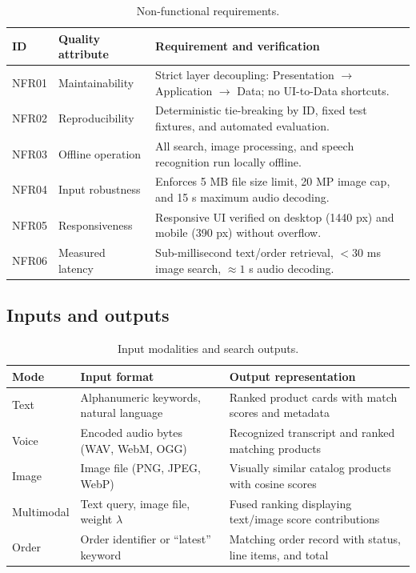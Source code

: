 \documentclass[12pt,a4paper]{article}
\begin{document}
\begin{table}[H]\centering\small
\caption{Non-functional requirements.}\label{tab:nfr}
\begin{tabularx}{\textwidth}{@{}llL@{}}\toprule
\textbf{ID} & \textbf{Quality attribute} & \textbf{Requirement and verification} \\\midrule
NFR01 & Maintainability & Strict layer decoupling: Presentation $\rightarrow$ Application $\rightarrow$ Data; no UI-to-Data shortcuts. \\
NFR02 & Reproducibility & Deterministic tie-breaking by ID, fixed test fixtures, and automated evaluation. \\
NFR03 & Offline operation & All search, image processing, and speech recognition run locally offline. \\
NFR04 & Input robustness & Enforces 5 MB file size limit, 20 MP image cap, and 15 s maximum audio decoding. \\
NFR05 & Responsiveness & Responsive UI verified on desktop (1440 px) and mobile (390 px) without overflow. \\
NFR06 & Measured latency & Sub-millisecond text/order retrieval, $<30$ ms image search, $\approx 1$ s audio decoding. \\
\bottomrule\end{tabularx}\end{table}

\subsection{Inputs and outputs}

\begin{table}[H]\centering\small
\caption{Input modalities and search outputs.}\label{tab:io}
\begin{tabularx}{\textwidth}{@{}lLL@{}}\toprule
\textbf{Mode} & \textbf{Input format} & \textbf{Output representation} \\\midrule
Text & Alphanumeric keywords, natural language & Ranked product cards with match scores and metadata \\
Voice & Encoded audio bytes (WAV, WebM, OGG) & Recognized transcript and ranked matching products \\
Image & Image file (PNG, JPEG, WebP) & Visually similar catalog products with cosine scores \\
Multimodal & Text query, image file, weight $\lambda$ & Fused ranking displaying text/image score contributions \\
Order & Order identifier or ``latest'' keyword & Matching order record with status, line items, and total \\
\bottomrule\end{tabularx}\end{table}
\end{document}
